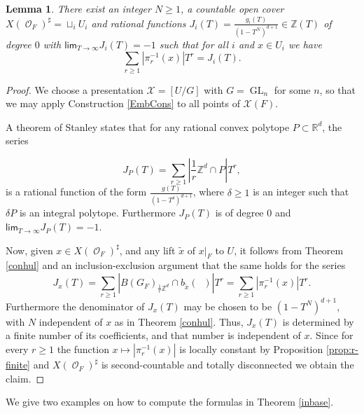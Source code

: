 \documentclass{article}
\DeclareMathOperator{\Oc}{\mathcal{O}}
\renewcommand{\lim}{\mathsf{lim}}
\DeclareMathOperator{\GL}{GL}
\newcommand{\BR}{{\mathbb{R}}}
\newcommand{\BZ}{{\mathbb{Z}}}
\newcommand{\CX}{{\mathcal X}}
\DeclareMathOperator{\Dinfty}{\mathbb{D}_F^{1/\infty}}
\theoremstyle{definition}
\theoremstyle{plain}
\newtheorem{lemma}[definition]{Lemma}
\begin{document}
\begin{lemma}\label{locco} There exist an integer $N\geq 1$, a countable open cover $X(\Oc_F)^\sharp = \sqcup_i U_i$ and rational functions $J_i(T) = \frac{g_i(T)}{(1-T^N)^{d+1}} \in \BZ(T)$ of degree $0$ with $\lim_{T \to \infty} J_i(T) = -1$ such that for all $i$ and $x \in U_i$ we have
\[ \sum_{r \geq 1}  |\pi_r^{-1}(x)| T^r = J_i(T).\] 
\end{lemma}
\begin{proof}
    We choose a presentation $\CX=[U/G]$ with $G=\GL_n$ for some $n$, so that we may apply Construction \ref{EmbCons} to all points of $\CX(F)$.

A theorem of Stanley \cite{St80} states that for any rational convex polytope $P \subset \BR^d$, the series

\[J_P(T) = \sum_{r \geq 1} |\frac{1}{r}\BZ^d \cap P|T^r, \]
is a rational function of the form $\frac{g(T)}{(1-T^\delta)^{d+1}}$, where $\delta \geq 1$ is an integer such that $\delta P$ is an integral polytope. Furthermore $J_P(T)$ is of degree $0$ and $\lim_{T \to \infty} J_P(T) = -1$. 

Now, given $x \in X(\Oc_F)^\sharp$, and any lift $\tilde x$ of $x|_F$ to $U$, it follows from Theorem \ref{conhul} and an inclusion-exclusion argument that the same holds for the series
\[J_x(T) = \sum_{r \geq 1} |B(G_F)_{\frac{1}{r}\BZ^d} \cap b_{\tilde x}(\Dinfty)|T^r= \sum_{r \geq 1} |\pi_r^{-1}(x)| T^r.\]
Furthermore the denominator of $J_x(T)$ may be chosen to be $(1-T^N)^{d+1}$, with $N$ independent of $x$ as in Theorem \ref{conhul}. Thus, $J_x(T)$ is determined by a finite number of its coefficients, and that number is independent of $x$. Since for every $r \geq 1$ the function $x \mapsto |\pi_r^{-1}(x)|$ is locally constant by Proposition \ref{prop:r-finite} and $ X(\Oc_F)^\sharp$ is second-countable and totally disconnected we obtain the claim.
\end{proof}


We give two examples on how to compute the formulas in Theorem \ref{inbase}.
\end{document}

